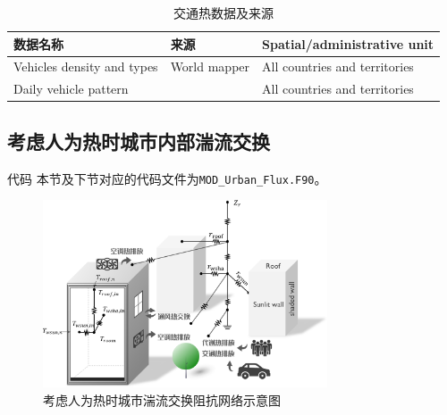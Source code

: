 \begin{table}[htbp]
  \centering
  \caption{交通热数据及来源}\label{tab:交通热数据及来源}
  \begin{tabular}{@{}lll@{}}
    \toprule
    数据名称                   & 来源                   & Spatial/administrative unit   \\ \midrule
    Vehicles density and types & World mapper           & All countries and territories \\
    Daily vehicle pattern      & \citet{Hallenbeck1997} & All countries and territories \\ \bottomrule
  \end{tabular}
\end{table}

\subsection{考虑人为热时城市内部湍流交换}

\begin{mymdframed}{代码}
  本节及下节对应的代码文件为\texttt{MOD\_Urban\_Flux.F90}。
\end{mymdframed}
{
  \begin{figure}[h!]
    \centering
    \includegraphics[width=0.75\textwidth]{Figures/城市模式/CoLM城市模式人为热阻抗交换网络.png}
    \caption{考虑人为热时城市湍流交换阻抗网络示意图}
    \label{fig:考虑人为热时城市内部湍流交换过程}
  \end{figure}
}
